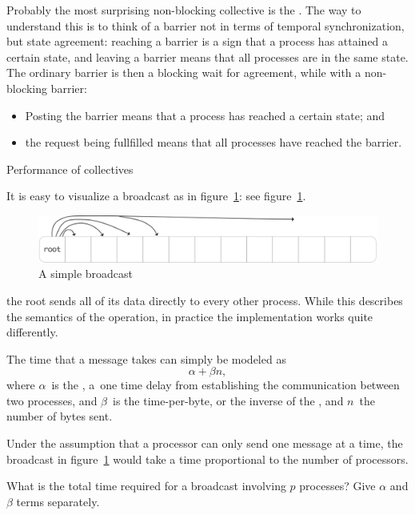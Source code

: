 Probably the most surprising non-blocking collective is the
. The way to understand this is to think of
a barrier not in terms of temporal synchronization, but state
agreement: reaching a barrier is a sign that a process has attained a
certain state, and leaving a barrier means that all processes are in
the same state. The ordinary barrier is then a blocking wait for
agreement, while with a non-blocking barrier:
\begin{itemize}
\item Posting the barrier means that a process has reached a certain
  state; and
\item the request being fullfilled means that all processes have
  reached the barrier.
\end{itemize}



 {Performance of collectives}

It is easy to visualize a broadcast as in figure~\ref{fig:bcast-simple}:
see figure~\ref{fig:bcast-simple}.
\begin{figure}[ht]
  \includegraphics[scale=.08]{graphics/bcast-simple}
  \caption{A simple broadcast}
  \label{fig:bcast-simple}
\end{figure}
the root sends all of its data directly to every other process.
While this describes the semantics of the operation, in practice
the implementation works quite differently.

The time that a message takes can simply be modeled as
\[ \alpha +\beta n, \]
where $\alpha$~is the , a~one time
delay from establishing the communication between two processes,
and $\beta$~is the time-per-byte, or the inverse of the ,
and $n$~the number of bytes sent.

Under the assumption that
a processor can only send one message at a time,
the broadcast in
figure~\ref{fig:bcast-simple} would take a time proportional to the
number of processors.

\begin{exercise}
  \label{ex:latencylinear}
  What is the total time required for a broadcast involving $p$
  processes?
  Give $\alpha$ and $\beta$ terms separately.
\end{exercise}

